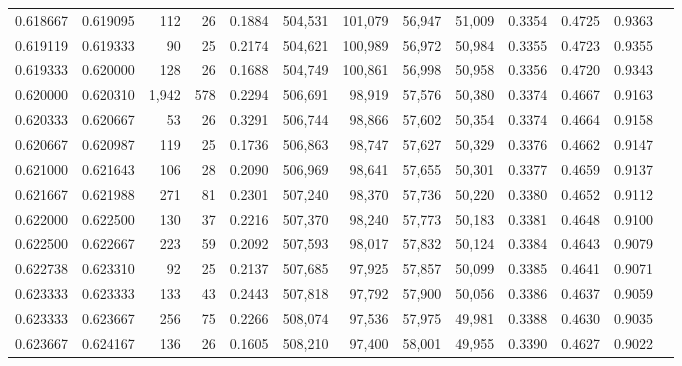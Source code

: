\begin{tabular}{rrrrrrrrrrrrr}
0.618667 & 0.619095 &   112 &  26 &                                     0.1884 & 504,531 & 101,079 &  56,947 &  51,009 & 0.3354 & 0.4725 & 0.9363 \\
0.619119 & 0.619333 &    90 &  25 &                                     0.2174 & 504,621 & 100,989 &  56,972 &  50,984 & 0.3355 & 0.4723 & 0.9355 \\
0.619333 & 0.620000 &   128 &  26 &                                     0.1688 & 504,749 & 100,861 &  56,998 &  50,958 & 0.3356 & 0.4720 & 0.9343 \\
0.620000 & 0.620310 & 1,942 & 578 &                                     0.2294 & 506,691 &  98,919 &  57,576 &  50,380 & 0.3374 & 0.4667 & 0.9163 \\
0.620333 & 0.620667 &    53 &  26 &                                     0.3291 & 506,744 &  98,866 &  57,602 &  50,354 & 0.3374 & 0.4664 & 0.9158 \\
0.620667 & 0.620987 &   119 &  25 &                                     0.1736 & 506,863 &  98,747 &  57,627 &  50,329 & 0.3376 & 0.4662 & 0.9147 \\
0.621000 & 0.621643 &   106 &  28 &                                     0.2090 & 506,969 &  98,641 &  57,655 &  50,301 & 0.3377 & 0.4659 & 0.9137 \\
0.621667 & 0.621988 &   271 &  81 &                                     0.2301 & 507,240 &  98,370 &  57,736 &  50,220 & 0.3380 & 0.4652 & 0.9112 \\
0.622000 & 0.622500 &   130 &  37 &                                     0.2216 & 507,370 &  98,240 &  57,773 &  50,183 & 0.3381 & 0.4648 & 0.9100 \\
0.622500 & 0.622667 &   223 &  59 &                                     0.2092 & 507,593 &  98,017 &  57,832 &  50,124 & 0.3384 & 0.4643 & 0.9079 \\
0.622738 & 0.623310 &    92 &  25 &                                     0.2137 & 507,685 &  97,925 &  57,857 &  50,099 & 0.3385 & 0.4641 & 0.9071 \\
0.623333 & 0.623333 &   133 &  43 &                                     0.2443 & 507,818 &  97,792 &  57,900 &  50,056 & 0.3386 & 0.4637 & 0.9059 \\
0.623333 & 0.623667 &   256 &  75 &                                     0.2266 & 508,074 &  97,536 &  57,975 &  49,981 & 0.3388 & 0.4630 & 0.9035 \\
0.623667 & 0.624167 &   136 &  26 &                                     0.1605 & 508,210 &  97,400 &  58,001 &  49,955 & 0.3390 & 0.4627 & 0.9022 \\

\end{tabular}
